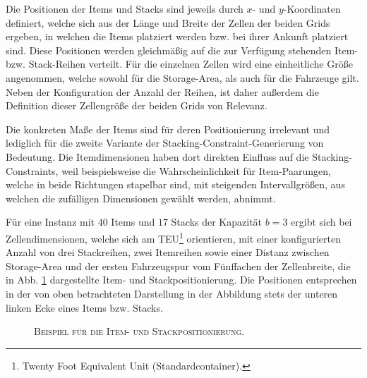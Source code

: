 Die Positionen der Items und Stacks sind jeweils durch $x$- und $y$-Koordinaten definiert,
welche sich aus der Länge und Breite der Zellen der beiden Grids ergeben, in welchen die Items platziert werden
bzw. bei ihrer Ankunft platziert sind. Diese Positionen werden gleichmäßig auf die zur Verfügung stehenden
Item- bzw. Stack-Reihen verteilt. Für die einzelnen Zellen wird eine einheitliche Größe angenommen,
welche sowohl für die Storage-Area, als auch für die Fahrzeuge gilt. Neben der Konfiguration der Anzahl der Reihen,
ist daher außerdem die Definition dieser Zellengröße der beiden Grids von Relevanz.

Die konkreten Maße der Items sind für deren Positionierung irrelevant und lediglich für
die zweite Variante der Stacking-Constraint-Generierung von Bedeutung.
Die Itemdimensionen haben dort direkten Einfluss auf die Stacking-Constraints,
weil beispielsweise die Wahrscheinlichkeit für Item-Paarungen, welche in beide Richtungen stapelbar sind,
mit steigenden Intervallgrößen, aus welchen die zufälligen Dimensionen gewählt werden, abnimmt.

Für eine Instanz mit $40$ Items und $17$ Stacks der Kapazität $b = 3$ ergibt sich bei
Zellendimensionen, welche sich am TEU\footnote{Twenty Foot Equivalent Unit (Standardcontainer).} orientieren,
mit einer konfigurierten Anzahl von drei Stackreihen,
zwei Itemreihen sowie einer Distanz zwischen Storage-Area und der ersten Fahrzeugspur vom Fünffachen
der Zellenbreite, die in Abb. \ref{fig:positioning_example} dargestellte Item- und Stackpositionierung.
Die Positionen entsprechen in der von oben betrachteten Darstellung in der Abbildung stets der unteren linken Ecke
eines Items bzw. Stacks.

\begin{figure}[H]
\centering
{}
\caption{\textsc{Beispiel für die Item- und Stackpositionierung.}}
\label{fig:positioning_example}
\end{figure}

